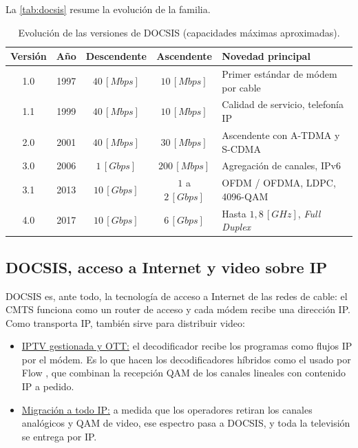 La \autoref{tab:docsis} resume la evolución de la familia.

\begin{table}[H]
    \centering
    \caption{Evolución de las versiones de DOCSIS (capacidades máximas aproximadas).}
    \label{tab:docsis}
    \begin{tabular}{c c c c p{5.4cm}}
        \toprule
        \textbf{Versión} & \textbf{Año} & \textbf{Descendente} & \textbf{Ascendente} & \textbf{Novedad principal} \\
        \midrule
        1.0 & 1997 & $40 \, [Mbps]$ & $10 \, [Mbps]$ & Primer estándar de módem por cable \\
        1.1 & 1999 & $40 \, [Mbps]$ & $10 \, [Mbps]$ & Calidad de servicio, telefonía IP \\
        2.0 & 2001 & $40 \, [Mbps]$ & $30 \, [Mbps]$ & Ascendente con A-TDMA y S-CDMA \\
        3.0 & 2006 & $1 \, [Gbps]$ & $200 \, [Mbps]$ & Agregación de canales, IPv6 \\
        3.1 & 2013 & $10 \, [Gbps]$ & $1$ a $2 \, [Gbps]$ & OFDM / OFDMA, LDPC, 4096-QAM \\
        4.0 & 2017 & $10 \, [Gbps]$ & $6 \, [Gbps]$ & Hasta $1{,}8 \, [GHz]$, \textit{Full Duplex} \\
        \bottomrule
    \end{tabular}
\end{table}

\subsection{DOCSIS, acceso a Internet y video sobre IP}
DOCSIS es, ante todo, la tecnología de acceso a Internet de las redes de cable: el CMTS funciona como un router de acceso y cada módem recibe una dirección IP. Como transporta IP, también sirve para distribuir video:
\begin{itemize}
    \item \underline{IPTV gestionada y OTT:} el decodificador recibe los programas como flujos IP por el módem. Es lo que hacen los decodificadores híbridos como el usado por Flow \cite{lightwave_flow}, que combinan la recepción QAM de los canales lineales con contenido IP a pedido.
    \item \underline{Migración a todo IP:} a medida que los operadores retiran los canales analógicos y QAM de video, ese espectro pasa a DOCSIS, y toda la televisión se entrega por IP.
\end{itemize}
